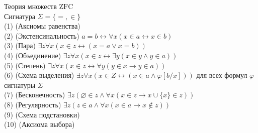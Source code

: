 Теория множеств $\text{ZFC}$\\
Сигнатура $\Sigma=\{=, \in\}$\\
(1) (Аксиомы равенства)\\
(2) (Экстенсинальность) $a=b \leftrightarrow \forall x(x \in a \leftrightarrow x \in b)$\\
(3) (Пара) $\exists z \forall x(x \in z \leftrightarrow(x=a \vee x=b))$\\
(4) (Объединение) $\exists z \forall x(x \in z \leftrightarrow \exists y(x \in y \wedge y \in a))$\\
(5) (Степень) $\exists z \forall x(x \in z \leftrightarrow \forall y(y \in x \rightarrow y \in a))$\\
(6) (Схема выделения) $\exists z \forall x(x \in Z \leftrightarrow(x \in a \wedge \varphi[b / x]))$ для всех формул $\varphi$ сигнатуры $\Sigma$\\
(7) (Бесконечность) $\exists z(\varnothing \in z \wedge \forall x(x \in z \rightarrow x \cup\{x\} \in z))$\\
(8) (Регулярность) $\exists z(z \in a \wedge \forall x(x \in a \rightarrow x \notin z))$\\
(9) (Схема подстановки)\\
(10) (Аксиома выбора)
\vskip 0.3in

